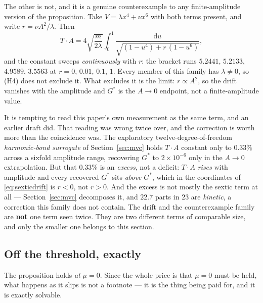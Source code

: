 \documentclass[11pt,a4paper]{article}
\newcommand{\Gstar}{{G^{*}}}
\newcommand{\dd}{\mathrm{d}}
\theoremstyle{definition}
\theoremstyle{plain}
\theoremstyle{remark}
\begin{document}
The other is not, and it is a genuine counterexample to any
finite-amplitude version of the proposition. Take $V = \lambda x^4 + \nu
x^6$ with both terms present, and write $r = \nu A^2/\lambda$. Then
\begin{equation}
T\cdot A = 4\sqrt{\frac{m}{2\lambda}}
\int_0^1\frac{\dd u}{\sqrt{(1-u^4) + r\,(1-u^6)}},
\label{eq:sexticdrift}
\end{equation}
and the constant sweeps \emph{continuously} with $r$: the bracket runs
$5.2441$, $5.2133$, $4.9589$, $3.5563$ at $r = 0,\,0.01,\,0.1,\,1$. Every
member of this family has $\lambda\neq0$, so (H4) does not exclude it.
What excludes it is the limit: $r\propto A^2$, so the drift vanishes
with the amplitude and $\Gstar$ is the $A\to0$ endpoint, not a
finite-amplitude value.

It is tempting to read this paper's own measurement as the same term, and
an earlier draft did. That reading was wrong twice over, and the
correction is worth more than the coincidence was. The exploratory
twelve-degree-of-freedom \emph{harmonic-bond surrogate} of
Section~\ref{sec:mvc} holds
$T\cdot A$ constant only to $0.33\%$ across a sixfold amplitude range,
recovering $\Gstar$ to $2\times10^{-6}$ only in the $A\to0$
extrapolation. But that $0.33\%$ is an \emph{excess}, not a deficit:
$T\cdot A$ \emph{rises} with amplitude and every recovered $\Gstar$ sits
\emph{above} $\Gstar$, which in the coordinates of
\eqref{eq:sexticdrift} is $r<0$, not $r>0$. And the excess is not mostly
the sextic term at all --- Section~\ref{sec:mvc} decomposes it, and
$22.7$ parts in $23$ are \emph{kinetic}, a correction this family does not
contain. The drift and the counterexample family are \textbf{not} one
term seen twice. They are two different terms of comparable size, and
only the smaller one belongs to this section.

\subsection{Off the threshold, exactly}
\label{sec:crossover}

The proposition holds \emph{at} $\mu = 0$. Since the whole price is that
$\mu = 0$ must be held, what happens as it slips is not a footnote --- it
is the thing being paid for, and it is exactly solvable.
\end{document}
